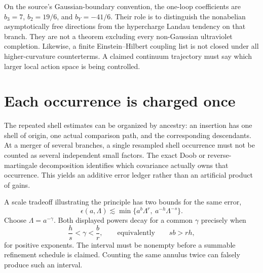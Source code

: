 \documentclass[11pt,a4paper,oneside]{book}
\theoremstyle{plain}
\theoremstyle{definition}
\theoremstyle{remark}
\begin{document}
On the source's Gaussian-boundary convention, the one-loop coefficients are $b_3=7$, $b_2=19/6$, and $b_Y=-41/6$. Their role is to distinguish the nonabelian asymptotically free directions from the hypercharge Landau tendency on that branch. They are not a theorem excluding every non-Gaussian ultraviolet completion. Likewise, a finite Einstein--Hilbert coupling list is not closed under all higher-curvature counterterms. A claimed continuum trajectory must say which larger local action space is being controlled. \cite{R3,R4,R5}

\section{Each occurrence is charged once}
The repeated shell estimates can be organized by ancestry: an insertion has one shell of origin, one actual comparison path, and the corresponding descendants. At a merger of several branches, a single resampled shell occurrence must not be counted as several independent small factors. The exact Doob or reverse-martingale decomposition identifies which covariance actually owns that occurrence. This yields an additive error ledger rather than an artificial product of gains. \cite{R2,R4,R5}

A scale tradeoff illustrating the principle has two bounds for the same error,
\begin{equation}
 \epsilon(a,\Lambda)\lesssim
 \min\{a^b\Lambda^r,\ a^{-h}\Lambda^{-s}\}.
 \label{eq:two-regime}
\end{equation}
Choose $\Lambda=a^{-\gamma}$. Both displayed powers decay for a common $\gamma$ precisely when
\begin{equation}
 \frac hs<\gamma<\frac br,
 \qquad\text{equivalently}\qquad sb>rh,
 \label{eq:scale-window}
\end{equation}
for positive exponents. The interval must be nonempty before a summable refinement schedule is claimed. Counting the same annulus twice can falsely produce such an interval. \cite{R5,R6}
\end{document}
